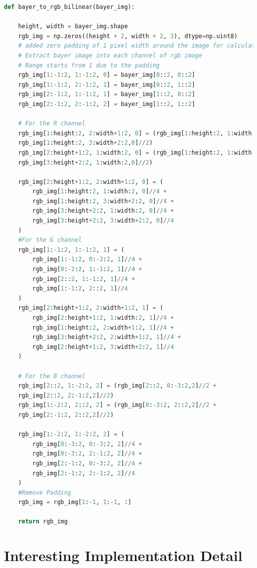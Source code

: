 \begin{lstlisting}[language=python]
def bayer_to_rgb_bilinear(bayer_img):
    
    height, width = bayer_img.shape
    rgb_img = np.zeros((height + 2, width + 2, 3), dtype=np.uint8)
    # added zero padding of 1 pixel width around the image for calculation efficiency    
    # Extract bayer image into each channel of rgb image
    # Range starts from 1 due to the padding
    rgb_img[1:-1:2, 1:-1:2, 0] = bayer_img[0::2, 0::2]    
    rgb_img[1:-1:2, 2:-1:2, 1] = bayer_img[0::2, 1::2]
    rgb_img[2:-1:2, 1:-1:2, 1] = bayer_img[1::2, 0::2]
    rgb_img[2:-1:2, 2:-1:2, 2] = bayer_img[1::2, 1::2]

    # For the R channel
    rgb_img[1:height:2, 2:width+1:2, 0] = (rgb_img[1:height:2, 1:width:2,0]//2 + 
    rgb_img[1:height:2, 3:width+2:2,0]//2) 
    rgb_img[2:height+1:2, 1:width:2, 0] = (rgb_img[1:height:2, 1:width:2,0]//2 + 
    rgb_img[3:height+2:2, 1:width:2,0]//2) 

    rgb_img[2:height+1:2, 2:width+1:2, 0] = (
        rgb_img[1:height:2, 1:width:2, 0]//4 + 
        rgb_img[1:height:2, 3:width+2:2, 0]//4 +
        rgb_img[3:height+2:2, 1:width:2, 0]//4 + 
        rgb_img[3:height+2:2, 3:width+2:2, 0]//4
    ) 
    #For the G channel
    rgb_img[1:-1:2, 1:-1:2, 1] = (
        rgb_img[1:-1:2, 0:-2:2, 1]//4 + 
        rgb_img[0:-2:2, 1:-1:2, 1]//4 +
        rgb_img[2::2, 1:-1:2, 1]//4 + 
        rgb_img[1:-1:2, 2::2, 1]//4
    )
    rgb_img[2:height+1:2, 2:width+1:2, 1] = (
        rgb_img[2:height+1:2, 1:width:2, 1]//4 + 
        rgb_img[1:height:2, 2:width+1:2, 1]//4 +
        rgb_img[3:height+2:2, 2:width+1:2, 1]//4 + 
        rgb_img[2:height+1:2, 3:width+2:2, 1]//4
    )

    # For the B channel
    rgb_img[2::2, 1:-2:2, 2] = (rgb_img[2::2, 0:-3:2,2]//2 +
    rgb_img[2::2, 2:-1:2,2]//2) 
    rgb_img[1:-2:2, 2::2, 2] = (rgb_img[0:-3:2, 2::2,2]//2 +
    rgb_img[2:-1:2, 2::2,2]//2) 
    
    rgb_img[1:-2:2, 1:-2:2, 2] = (
        rgb_img[0:-3:2, 0:-3:2, 2]//4 + 
        rgb_img[0:-3:2, 2:-1:2, 2]//4 +
        rgb_img[2:-1:2, 0:-3:2, 2]//4 + 
        rgb_img[2:-1:2, 2:-1:2, 2]//4
    )    
    #Remove Padding
    rgb_img = rgb_img[1:-1, 1:-1, :]
    
    return rgb_img
    \end{lstlisting}


\section*{Interesting Implementation Detail}

